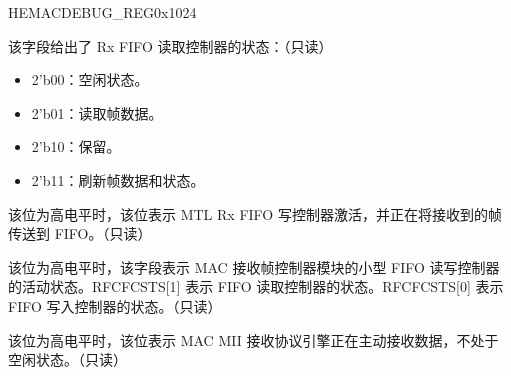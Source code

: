 \addtocounter{Regfloat}{-1}
\begin{register}{H}{EMACDEBUG\_REG}{0x1024}
\begin{regdesc}\begin{reglist}
\item[继上一页寄存器描述。]

\item [MTLRFRCS]
该字段给出了 Rx FIFO 读取控制器的状态：（只读）
\begin{itemize}
\item 2'b00：空闲状态。\item  2'b01：读取帧数据。 \item 2'b10：保留。 \item 2'b11：刷新帧数据和状态。\end{itemize}
\item [MTLRFWCAS]该位为高电平时，该位表示 MTL Rx FIFO 写控制器激活，并正在将接收到的帧传送到 FIFO。（只读）
\item [MACRFFCS]该位为高电平时，该字段表示 MAC 接收帧控制器模块的小型 FIFO 读写控制器的活动状态。RFCFCSTS[1] 表示 FIFO 读取控制器的状态。RFCFCSTS[0] 表示 FIFO 写入控制器的状态。（只读）
\item [MACRPES] 该位为高电平时，该位表示 MAC MII 接收协议引擎正在主动接收数据，不处于空闲状态。（只读）
\end{reglist}\end{regdesc}
\end{register}


